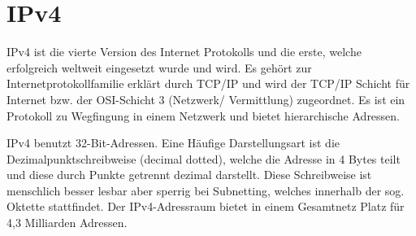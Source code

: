 \section{IPv4}

IPv4 ist die vierte Version des Internet Protokolls und die erste, welche erfolgreich weltweit eingesetzt wurde und wird. Es gehört zur Internetprotokollfamilie erklärt durch TCP/IP und wird der TCP/IP Schicht für Internet bzw. der OSI-Schicht 3 (Netzwerk/ Vermittlung) zugeordnet. Es ist ein Protokoll zu Wegfingung in einem Netzwerk und bietet hierarchische Adressen.

IPv4 benutzt 32-Bit-Adressen. Eine Häufige Darstellungsart ist die Dezimalpunktschreibweise (decimal dotted), welche die Adresse in 4 Bytes teilt und diese durch Punkte getrennt dezimal darstellt. Diese Schreibweise ist menschlich besser lesbar aber sperrig bei Subnetting, welches innerhalb der sog. Oktette stattfindet. Der IPv4-Adressraum bietet in einem Gesamtnetz Platz für 4,3 Milliarden Adressen.